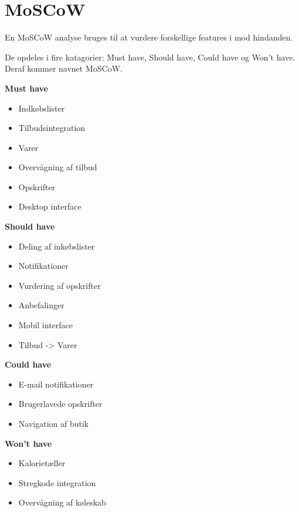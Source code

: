 \chapter{MoSCoW}
En MoSCoW analyse bruges til at vurdere forskellige features i mod hindanden. %

De opdeles i fire katagorier: Must have, Should have, Could have og Won't have.
Deraf kommer navnet MoSCoW.

\noindent\parbox[t]{2.7in}{\raggedright
	\textbf{Must have}
	\begin{itemize}
			\item Indkøbslister
			\item Tilbudsintegration
			\item Varer
			\item Overvågning af tilbud
			\item Opskrifter
			\item Desktop interface
	\end{itemize}
}
\parbox[t]{2.7in}{\raggedright%
	\textbf{Should have}
	\begin{itemize}
		\item Deling af inkøbslister
		\item Notifikationer
		\item Vurdering af opskrifter
		\item Anbefalinger
		\item Mobil interface
		\item Tilbud -> Varer	
	\end{itemize}
}

\noindent\parbox[t]{2.7in}{\raggedright
	\textbf{Could have}
	\begin{itemize}
			\item E-mail notifikationer
			\item Brugerlavede opskrifter
			\item Navigation af butik
	\end{itemize}
}
\parbox[t]{2.7in}{\raggedright%
	\textbf{Won't have}
	\begin{itemize}
		\item Kalorietæller 
		\item Stregkode integration
		\item Overvågning af køleskab
	\end{itemize}
}

